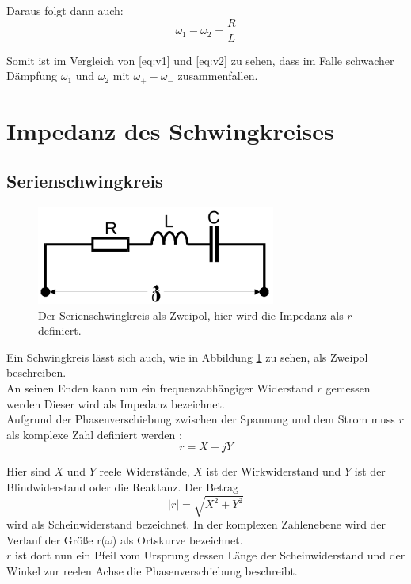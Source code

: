     \noindent Daraus folgt dann auch:
    \begin{equation}
        \omega_1 - \omega_2 = \frac{R}{L} 
        \label{eq:v2}
    \end{equation}

    \noindent Somit ist im Vergleich von \ref{eq:v1} und \ref{eq:v2} zu sehen, dass im Falle schwacher Dämpfung $\omega_1$ und $\omega_2$ 
    mit $\omega_+ - \omega_-$ zusammenfallen.


    \section{Impedanz des Schwingkreises}


        \subsection{Serienschwingkreis}

        
        \begin{figure}[H]
            \centering
            \includegraphics[width=0.7\textwidth]{images/Zweipol.PNG}
            \caption{Der Serienschwingkreis als Zweipol, hier wird die Impedanz als $r$ definiert\protect \cite{V354}.}
            \label{img:zweip}
        \end{figure}

    \noindent Ein Schwingkreis lässt sich auch, wie in Abbildung \ref{img:zweip} zu sehen, als Zweipol beschreiben.\\
    An seinen Enden kann nun ein frequenzabhängiger Widerstand $r$ gemessen werden Dieser wird als Impedanz bezeichnet.\\ 
    Aufgrund der Phasenverschiebung zwischen der Spannung 
    und dem Strom muss $r$ als komplexe Zahl definiert werden :
    \begin{equation}
        r = X + jY \nonumber
    \end{equation}

    \noindent Hier sind $X$ und $Y$ reele Widerstände, $X$ ist  der Wirkwiderstand und $Y$ ist der Blindwiderstand oder die Reaktanz. Der Betrag
    \begin{equation}
        |r| = \sqrt{X^2 + Y^2} \nonumber
    \end{equation}
    \noindent wird als Scheinwiderstand bezeichnet. In der komplexen Zahlenebene wird der Verlauf der Größe r($\omega$) als Ortskurve bezeichnet.\\
    $r$ ist dort nun ein Pfeil vom Ursprung dessen Länge der Scheinwiderstand und der Winkel zur reelen Achse die Phasenverschiebung 
    beschreibt.

